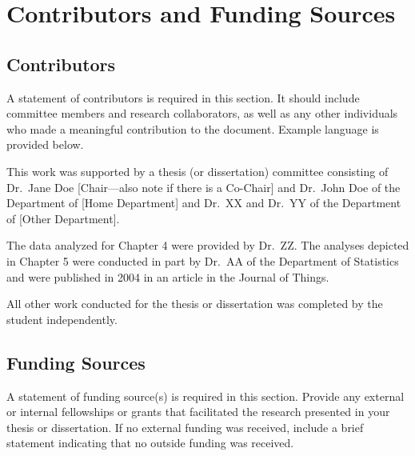 \chapter[unnumbered=true]{Contributors and Funding Sources}

\section*{\bfseries Contributors}
A statement of contributors is required in this section.
It should include committee members and research collaborators, as well as any other individuals who made a meaningful contribution to the document.
Example language is provided below.

This work was supported by a thesis (or dissertation) committee consisting of Dr.~Jane Doe [Chair---also note if there is a Co-Chair] and Dr.~John Doe of the Department of [Home Department] and Dr.~XX and Dr.~YY of the Department of [Other Department].

The data analyzed for Chapter 4 were provided by Dr.~ZZ.
The analyses depicted in Chapter 5 were conducted in part by Dr.~AA of the Department of Statistics and were published in 2004 in an article in the Journal of Things.

All other work conducted for the thesis or dissertation was completed by the student independently.

\section*{\bfseries Funding Sources}
A statement of funding source(s) is required in this section.
Provide any external or internal fellowships or grants that facilitated the research presented in your thesis or dissertation.
If no external funding was received, include a brief statement indicating that no outside funding was received.
